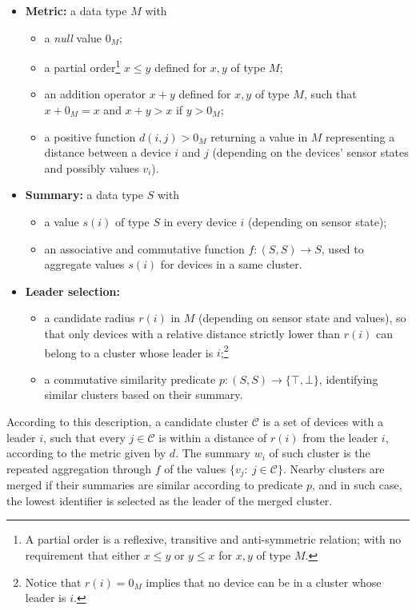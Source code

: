 \begin{itemize}
	\item \textbf{Metric:} a data type $M$ with
	\begin{itemize}
		\item a \emph{null} value $0_M$;
		\item a partial order\footnote{A partial order is a reflexive, transitive and anti-symmetric relation; with no requirement that either $x \leq y$ or $y \leq x$ for $x,y$ of type $M$.} $x \leq y$ defined for $x,y$ of type $M$;
		\item an addition operator $x + y$ defined for $x,y$ of type $M$, such that $x + 0_M = x$ and $x + y > x$ if $y > 0_M$;
		\item a positive function $d(i, j) > 0_M$ returning a value in $M$ representing a distance between a device $i$ and $j$ (depending on the devices' sensor states and possibly values $v_i$). 
	\end{itemize}
	\item \textbf{Summary:} a data type $S$ with
	\begin{itemize}
		\item a value $s(i)$ of type $S$ in every device $i$ (depending on sensor state);
		\item an associative and commutative function $f : (S,S) \to S$, used to aggregate values $s(i)$ for devices in a same cluster.
	\end{itemize}
	\item \textbf{Leader selection:}
	\begin{itemize}
		\item a candidate radius $r(i)$ in $M$ (depending on sensor state and values), so that only devices with a relative distance strictly lower than $r(i)$ can belong to a cluster whose leader is $i$;\footnote{Notice that $r(i) = 0_M$ implies that no device can be in a cluster whose leader is $i$.}
		\item a commutative similarity predicate $p : (S,S) \to \{\top, \bot\}$, identifying similar clusters based on their summary.
	\end{itemize}
\end{itemize}
According to this description, a candidate cluster $\mathcal{C}$ is a set of devices with a leader $i$,
 such that every $j \in \mathcal{C}$ is within a distance of $r(i)$ from the leader $i$,
 according to the metric given by $d$.
 The summary $w_i$ of such cluster is the repeated aggregation through $f$ of the values $\{v_j : ~ j \in \mathcal{C}\}$.
 Nearby clusters are merged if their summaries are similar according to predicate $p$,
 and in such case, the lowest identifier is selected as the leader of the merged cluster.

